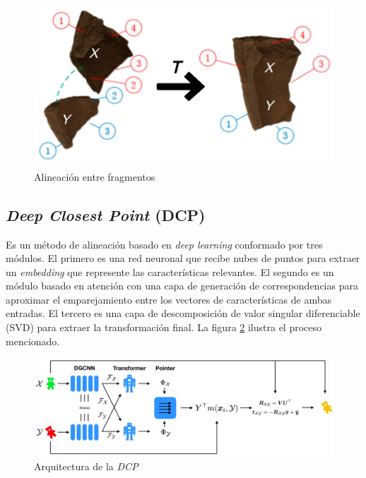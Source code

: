 \begin{figure}[!h]
    \centering
     \includegraphics[scale=0.19]{images/alineacion.png}
    \caption{Alineación entre fragmentos \cite{6}}
    \label{fig:alineacion}
\end{figure}


\subsection{\textit{Deep Closest Point} (DCP)}
Es un método de alineación basado en \textit{deep learning} conformado por tres módulos. El primero es una red neuronal que recibe nubes de puntos para extraer un \textit{embedding} que represente las características relevantes. El segundo es un módulo basado en atención con una capa de generación de correspondencias para aproximar el emparejamiento entre los vectores de características de ambas entradas. El tercero es una capa de descomposición de valor singular diferenciable (SVD) para extraer la transformación final. La figura \ref{fig:dcp} ilustra el proceso mencionado.
\begin{figure}[!h]
    \centering
     \includegraphics[scale=0.3]{images/dcp.png}
    \caption{Arquitectura de la \textit{DCP} \cite{16}}
    \label{fig:dcp}
\end{figure}

